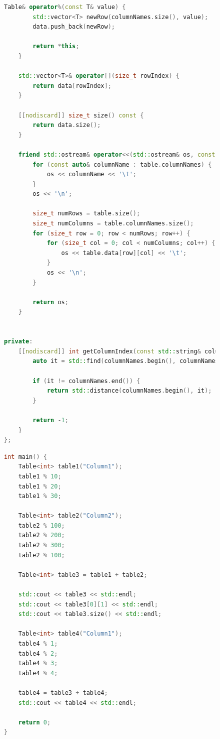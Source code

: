 \documentclass[a4paper, 14pt]{extarticle}
\begin{document}
\begin{figure}[!htb]
\begin{lstlisting}[language={C++},caption={Class Table (продолжение)},label={lst:code2}]
Table& operator%(const T& value) {
        std::vector<T> newRow(columnNames.size(), value);
        data.push_back(newRow);

        return *this;
    }

    std::vector<T>& operator[](size_t rowIndex) {
        return data[rowIndex];
    }

    [[nodiscard]] size_t size() const {
        return data.size();
    }

    friend std::ostream& operator<<(std::ostream& os, const Table& table) {
        for (const auto& columnName : table.columnNames) {
            os << columnName << '\t';
        }
        os << '\n';

        size_t numRows = table.size();
        size_t numColumns = table.columnNames.size();
        for (size_t row = 0; row < numRows; row++) {
            for (size_t col = 0; col < numColumns; col++) {
                os << table.data[row][col] << '\t';
            }
            os << '\n';
        }

        return os;
    }


private:
    [[nodiscard]] int getColumnIndex(const std::string& columnName) const {
        auto it = std::find(columnNames.begin(), columnNames.end(), columnName);

        if (it != columnNames.end()) {
            return std::distance(columnNames.begin(), it);
        }

        return -1;
    }
};
\end{lstlisting}
\end{figure}
\begin{figure}[!htb]
\begin{lstlisting}[language={C++},caption={Main (в том же файле)},label={lst:code3}]
int main() {
    Table<int> table1("Column1");
    table1 % 10;
    table1 % 20;
    table1 % 30;

    Table<int> table2("Column2");
    table2 % 100;
    table2 % 200;
    table2 % 300;
    table2 % 100;

    Table<int> table3 = table1 + table2;

    std::cout << table3 << std::endl;
    std::cout << table3[0][1] << std::endl;
    std::cout << table3.size() << std::endl;

    Table<int> table4("Column1");
    table4 % 1;
    table4 % 2;
    table4 % 3;
    table4 % 4;

    table4 = table3 + table4;
    std::cout << table4 << std::endl;

    return 0;
}
\end{lstlisting}
\end{figure}
\end{document}

